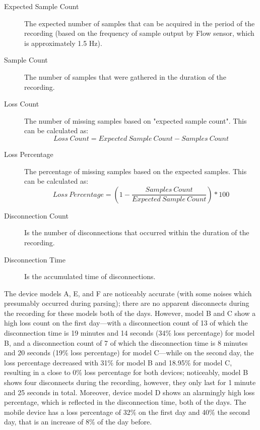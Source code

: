 \begin{description}
    \item[Expected Sample Count] The expected number of samples that can be acquired in the period of the recording (based on the frequency of sample output by Flow sensor, which is approximately 1.5 Hz).
    \item[Sample Count] The number of samples that were gathered in the duration of the recording. 
    \item[Loss Count] The number of missing samples based on "expected sample count". This can be calculated as: 
\begin{equation} \label{losscount}
Loss\ Count = Expected\ Sample\ Count - Samples\ Count
\end{equation}
    \item[Loss Percentage] The percentage of missing samples based on the expected samples. This can be calculated as:
\begin{equation} \label{losscount}
Loss\ Percentage = (1 - \frac{Samples\ Count}{Expected\ Sample\ Count}) * 100
\end{equation}
    \item[Disconnection Count] Is the number of disconnections that occurred within the duration of the recording.
    \item[Disconnection Time] Is the accumulated time of disconnections. 
\end{description}

The device models A, E, and F are noticeably accurate (with some noises which presumably occurred during parsing); there are no apparent disconnects during the recording for these models both of the days. However, model B and C show a high loss count on the first day---with a disconnection count of 13 of which the disconnection time is 19 minutes and 14 seconds (34\% loss percentage) for model B, and a disconnection count of 7 of which the disconnection time is 8 minutes and 20 seconds (19\% loss percentage) for model C---while on the second day, the loss percentage decreased with 31\% for model B and 18.95\% for model C, resulting in a close to  0\% loss percentage for both devices; noticeably, model B shows four disconnects during the recording, however, they only last for 1 minute and 25 seconds in total. Moreover, device model D shows an alarmingly high loss percentage, which is reflected in the disconnection time, both of the days. The mobile device has a loss percentage of 32\% on the first day and 40\% the second day, that is an increase of 8\% of the day before. 

